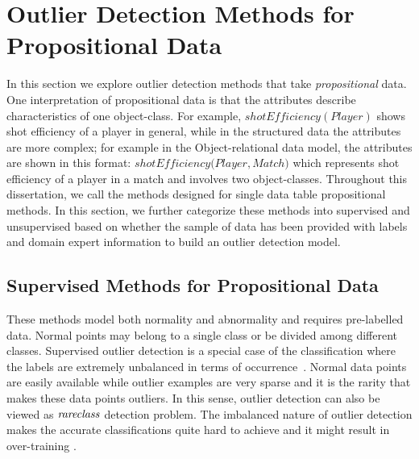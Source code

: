 
\section{Outlier Detection Methods for Propositional Data} \label{sec:categorizedMethods}
In this section we explore outlier detection methods that take \textit{propositional} data. One interpretation of propositional data is that the attributes describe characteristics of one object-class. For example, $\mathit{shotEfficiency(Player)}$ shows shot efficiency of a player in general, while in the structured data the attributes are more complex; for example in the Object-relational data model, the attributes are shown in this format: $\mathit{shotEfficiency(Player, Match})$ which represents shot efficiency of a player in a match and involves two object-classes.   Throughout this dissertation, we call the methods designed for single data table propositional methods. In this section, we further categorize these methods into supervised and unsupervised based on whether the sample of data has been provided with labels and domain expert information to build an outlier detection model.
\subsection{Supervised Methods for Propositional Data}
These methods model both normality and abnormality and requires pre-labelled data. Normal points may belong to a single class or be divided among different classes. Supervised outlier detection is a special case of the classification where the labels are extremely unbalanced in terms of occurrence~\cite{Chawla2004}.
Normal data points are easily available while outlier examples are very sparse and it is the rarity that makes these data points outliers. In this sense, outlier detection can also be viewed as $\it{rare class}$ detection problem. The imbalanced nature of outlier detection makes the accurate classifications quite hard to achieve and it might result in over-training \cite{aggarwal2013}.

